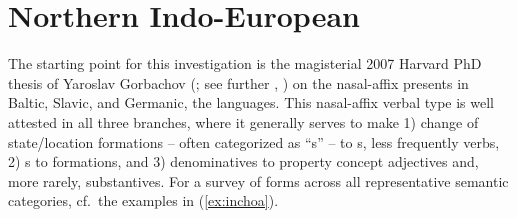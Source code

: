 \documentclass[output=paper,colorlinks,citecolor=brown]{langscibook}
\begin{document}
\section{Northern Indo-European}

The starting point for this investigation is the magisterial 2007 Harvard PhD thesis of Yaroslav Gorbachov (\citealt{Gorbachov2007}; see further  \citealt{VillanuevaSvensson2006}, \citeyear{VillanuevaSvensson2011}) on the  nasal-affix presents  in Baltic, Slavic, and Germanic, the  languages. This nasal-affix  verbal type is well attested in all three  branches, where it generally serves to make 1)   change of state/location formations -- often categorized as “s” -- to  s, less frequently  verbs, 2) s to  formations, and 3) denominatives to property concept adjectives and, more rarely, substantives. For a survey of forms across all representative semantic categories, cf.\ the examples in (\ref{ex:inchoa}).
\end{document}
